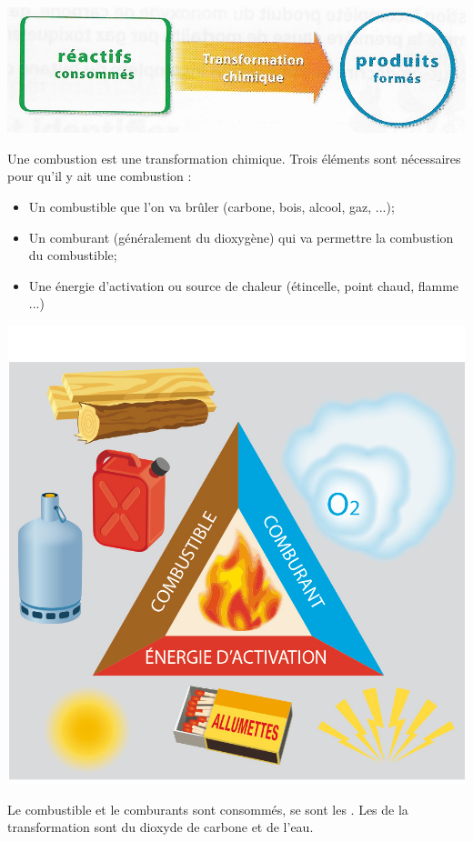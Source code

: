 \documentclass[12pt,a4paper]{article}
\begin{document}
\begin{center}
	\includegraphics[scale=0.4]{img/transfo}
\end{center}




\begin{myex}
	Une combustion est une transformation chimique.
	Trois éléments sont nécessaires pour qu'il y ait une combustion :
	\begin{multicols}{2}
		\begin{itemize}
			\item Un combustible que l'on va brûler (carbone, bois, alcool, gaz, ...);
			\item Un comburant (généralement du dioxygène) qui va permettre la combustion du combustible;
			\item Une énergie d'activation ou source de chaleur (étincelle, point chaud, flamme ...)
		\end{itemize}
		
		\begin{center}
			\includegraphics[scale=0.15]{img/triangle}
		\end{center}
	\end{multicols}
	
	Le combustible et le comburants sont consommés, se sont les . 
	Les  de la transformation sont du dioxyde de carbone et de l'eau.
	
	
\end{myex}


\end{document}
